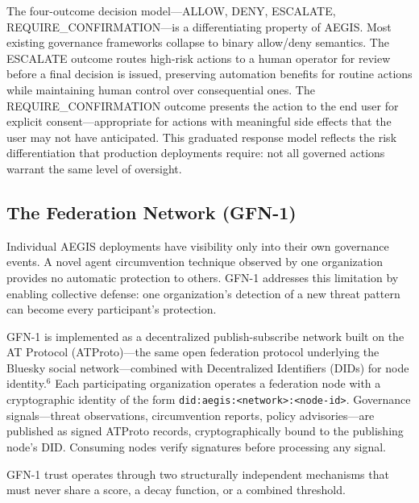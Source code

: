 \documentclass{IEEEcsmag}
\begin{document}
The four-outcome decision model---ALLOW, DENY, ESCALATE, REQUIRE\_CONFIRMATION---is a differentiating property of AEGIS. Most existing governance frameworks collapse to binary allow/deny semantics. The ESCALATE outcome routes high-risk actions to a human operator for review before a final decision is issued, preserving automation benefits for routine actions while maintaining human control over consequential ones. The REQUIRE\_CONFIRMATION outcome presents the action to the end user for explicit consent---appropriate for actions with meaningful side effects that the user may not have anticipated. This graduated response model reflects the risk differentiation that production deployments require: not all governed actions warrant the same level of oversight.

\subsection{The Federation Network (GFN-1)}

Individual AEGIS deployments have visibility only into their own governance events. A novel agent circumvention technique observed by one organization provides no automatic protection to others. GFN-1 addresses this limitation by enabling collective defense: one organization's detection of a new threat pattern can become every participant's protection.

GFN-1 is implemented as a decentralized publish-subscribe network built on the AT Protocol (ATProto)---the same open federation protocol underlying the Bluesky social network---combined with Decentralized Identifiers (DIDs) for node identity.$^{6}$ Each participating organization operates a federation node with a cryptographic identity of the form \texttt{did:aegis:<network>:<node-id>}. Governance signals---threat observations, circumvention reports, policy advisories---are published as signed ATProto records, cryptographically bound to the publishing node's DID. Consuming nodes verify signatures before processing any signal.

GFN-1 trust operates through two structurally independent mechanisms that must never share a score, a decay function, or a combined threshold.
\end{document}
